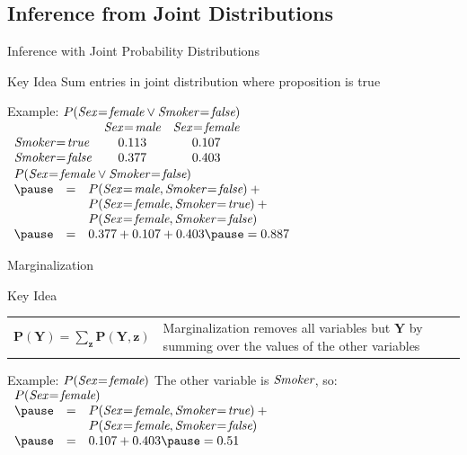 \documentclass[12pt]{beamer}
\newcommand{\EM}[1]{\mbox{\em#1}}
\newcommand{\tab}{\hspace{1em}}
\begin{document}
\subsection{Inference from Joint Distributions}
\begin{frame}{Inference with Joint Probability Distributions}
	\begin{block}{Key Idea}
		Sum entries in joint distribution where proposition is true
	\end{block}
	\pause
	\begin{block}{Example: $P(\EM{Sex}\!=\!\EM{female} \lor \EM{Smoker}\!=\!\EM{false})$}
		\tab\tab
		$
		\begin{array}{lcc}
			                           & \EM{Sex}\!=\!\EM{male} & \EM{Sex}\!=\!\EM{female} \\
			\EM{Smoker}\!=\!\EM{true}  & 0.113                  & 0.107 \\
			\EM{Smoker}\!=\!\EM{false} & 0.377                  & 0.403 \\
		\end{array}
		$
		\\ \medskip
		\pause
		$
		\begin{array}{lll}
			\lefteqn{P(\EM{Sex}\!=\!\EM{female} \lor \EM{Smoker}\!=\!\EM{false})} \\
			\pause
			& = & P(\EM{Sex}\!=\!\EM{male},\EM{Smoker}\!=\!\EM{false}) + \mbox{}\\
			&   & P(\EM{Sex}\!=\!\EM{female},\EM{Smoker}\!=\!\EM{true}) + \mbox{}\\
			&   & P(\EM{Sex}\!=\!\EM{female},\EM{Smoker}\!=\!\EM{false})\\
			\pause
			& = & 0.377 + 0.107 + 0.403 \pause = 0.887
		\end{array}
		$
	\end{block}
\end{frame}
\begin{frame}{Marginalization}
	\begin{block}{Key Idea}
		\begin{tabular}{lm{2.5in}}
			$
			\mathbf{P}(\mathbf{Y})
				= \sum\limits_{\mathbf{z}}{\mathbf{P}(\mathbf{Y}, \mathbf{z})}
			$
			&
			\alert{Marginalization} removes all variables but $\mathbf{Y}$ by summing over the values of the other variables
		\end{tabular}
	\end{block}
	\pause
	\begin{block}{Example: $P(\EM{Sex}\!=\!\EM{female})$}
		The other variable is $\EM{Smoker}$, so: \\[.5em]
		$
		\begin{array}{lll}
			\lefteqn{P(\EM{Sex}\!=\!\EM{female})} \\
			\pause & = & P(\EM{Sex}\!=\!\EM{female},\EM{Smoker}\!=\!\EM{true}) + \mbox{}\\
			       &   & P(\EM{Sex}\!=\!\EM{female},\EM{Smoker}\!=\!\EM{false})\\
			\pause & = & 0.107 + 0.403 \pause = 0.51
		\end{array}
		$
	\end{block}
\end{frame}
\end{document}
